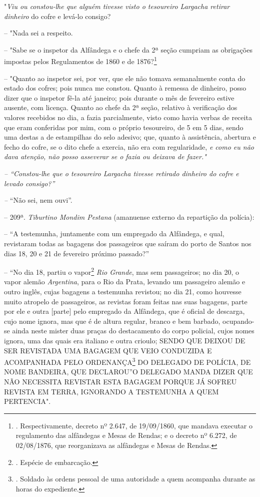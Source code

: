 "\emph{Viu ou constou-lhe que alguém tivesse visto o tesoureiro Largacha
retirar dinheiro} do cofre e levá-lo consigo?

-- "Nada sei a respeito.

-- "Sabe se o inspetor da Alfândega e o chefe da 2ª seção cumpriam as
obrigações impostas pelos Regulamentos de 1860 e de 1876?\footnote{.
  Respectivamente, decreto nº 2.647, de 19/09/1860, que mandava executar
  o regulamento das alfândegas e Mesas de Rendas; e o decreto nº 6.272,
  de 02/08/1876, que reorganizava as alfândegas e Mesas de Rendas.}

-- "Quanto ao inspetor sei, por ver, que ele não tomava semanalmente
conta do estado dos cofres; pois nunca me constou. Quanto à remessa de
dinheiro, posso dizer que o inspetor fê-la até janeiro; pois durante o
mês de fevereiro estive ausente, com licença. Quanto ao chefe da 2ª
seção, relativo à verificação dos valores recebidos no dia, a fazia
parcialmente, visto como havia verbas de receita que eram conferidas por
mim, com o próprio tesoureiro, de 5 em 5 dias, sendo uma destas a de
estampilhas do selo adesivo; que, quanto à assistência, abertura e fecho
do cofre, se o dito chefe a exercia, não era com regularidade, \emph{e
como eu não dava atenção, não posso asseverar se o fazia ou deixava de
fazer."}

\emph{-- ``Constou-lhe que o tesoureiro Largacha tivesse retirado
dinheiro do cofre e levado consigo?''}

\emph{--} ``Não sei, nem ouvi''.

-- 209ª. \emph{Tiburtino Mondim Pestana} (amanuense externo da
repartição da polícia):

-- ``A testemunha, juntamente com um empregado da Alfândega, e qual,
revistaram todas as bagagens dos passageiros que saíram do porto de
Santos nos dias 18, 20 e 21 de fevereiro próximo passado?''

-- ``No dia 18, partiu o vapor\footnote{. Espécie de embarcação.}
\emph{Rio Grande}, mas sem passageiros; no dia 20, o vapor alemão
\emph{Argentina}, para o Rio da Prata, levando um passageiro alemão e
outro inglês, cujas bagagens a testemunha revistou; no dia 21, como
houvesse muito atropelo de passageiros, as revistas foram feitas nas
suas bagagens, parte por ele e outra {[}parte{]} pelo empregado da
Alfândega, que é oficial de descarga, cujo nome ignora, mas que é de
altura regular, branco e bem barbado, ocupando-se ainda neste mister
duas praças do destacamento do corpo policial, cujos nomes ignora, uma
das quais era italiano e outra crioulo; SENDO QUE DEIXOU DE SER
REVISTADA UMA BAGAGEM QUE VEIO CONDUZIDA E ACOMPANHADA PELO
ORDENANÇA\footnote{. Soldado às ordens pessoal de uma autoridade a quem
  acompanha durante as horas do expediente.} DO DELEGADO DE POLÍCIA, DE
NOME BANDEIRA, QUE DECLAROU''O DELEGADO MANDA DIZER QUE NÃO NECESSITA
REVISTAR ESTA BAGAGEM PORQUE JÁ SOFREU REVISTA EM TERRA, IGNORANDO A
TESTEMUNHA A QUEM PERTENCIA".

